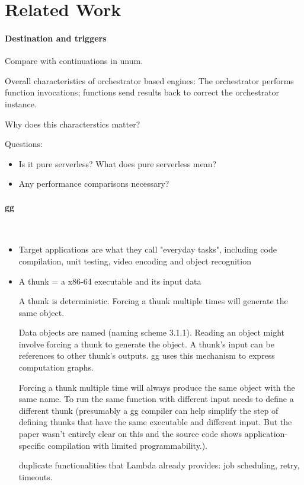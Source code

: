 \section{Related Work}\label{sec:related}

\paragraph{Destination and triggers}

Compare with continuations in unum.




Overall characteristics of orchestrator based engines: The orchestrator
performs function invocations; functions send results back to correct the
orchestrator instance.

Why does this characterstics matter?

Questions:

\begin{itemize}
	\item Is it pure serverless? What does pure serverless mean?
	\item Any performance comparisons necessary?
\end{itemize}

\paragraph{gg}~\cite{gg-atc}

\begin{itemize}
	\item Target applications are what they call "everyday tasks", including code compilation, unit testing, video encoding and object recognition
	\item A thunk = a x86-64 executable and its input data

	A thunk is deterministic. Forcing a thunk multiple times will generate the same object.

	Data objects are named (naming scheme 3.1.1). Reading an object might involve forcing a thunk to generate the object. A thunk's input can be references to other thunk's outputs. gg uses this mechanism to express computation graphs.

	Forcing a thunk multiple time will always produce the same object with the same name. To run the same function with different input needs to define a different thunk (presumably a gg compiler can help simplify the step of defining thunks that have the same executable and different input. But the paper wasn't entirely clear on this and the source code shows application-specific compilation with limited programmability.).


	duplicate functionalities that Lambda already provides: job scheduling, retry, timeouts.



\end{itemize}


